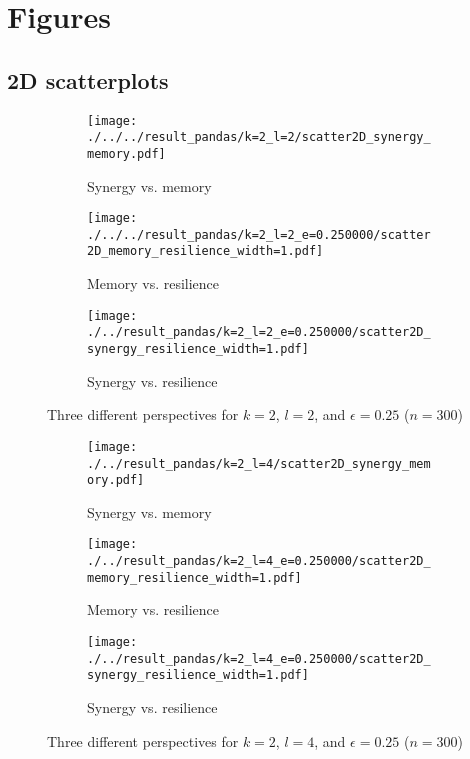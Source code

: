 \documentclass[../main.tex]{subfiles}
\begin{document}
\section{Figures}
\label{appendix_figures}

\subsection{2D scatterplots}

\begin{figure}[ht]
    \centering
    \begin{subfigure}[b]{0.3\textwidth}
        \texttt{[image: ./../../result\_pandas/k=2\_l=2/scatter2D\_synergy\_memory.pdf]}
        \caption{Synergy vs. memory}
    \end{subfigure}
    \begin{subfigure}[b]{0.3\textwidth}
        \texttt{[image: ./../../result\_pandas/k=2\_l=2\_e=0.250000/scatter2D\_memory\_resilience\_width=1.pdf]}
        \caption{Memory vs. resilience}
    \end{subfigure}
    \begin{subfigure}[b]{0.3\textwidth}
        \texttt{[image: ./../result\_pandas/k=2\_l=2\_e=0.250000/scatter2D\_synergy\_resilience\_width=1.pdf]}
        \caption{Synergy vs. resilience}
    \end{subfigure}
    \caption{Three different perspectives for $k=2$, $l=2$, and $\epsilon = 0.25$ ($n=300$)}
    \label{fig:2d22}
\end{figure}

\begin{figure}[ht]
    \centering
    \begin{subfigure}[b]{0.3\textwidth}
        \texttt{[image: ./../result\_pandas/k=2\_l=4/scatter2D\_synergy\_memory.pdf]}
        \caption{Synergy vs. memory}
    \end{subfigure}
    \begin{subfigure}[b]{0.3\textwidth}
        \texttt{[image: ./../result\_pandas/k=2\_l=4\_e=0.250000/scatter2D\_memory\_resilience\_width=1.pdf]}
        \caption{Memory vs. resilience}
    \end{subfigure}
    \begin{subfigure}[b]{0.3\textwidth}
        \texttt{[image: ./../result\_pandas/k=2\_l=4\_e=0.250000/scatter2D\_synergy\_resilience\_width=1.pdf]}
        \caption{Synergy vs. resilience}
    \end{subfigure}
    \caption{Three different perspectives for $k=2$, $l=4$, and $\epsilon = 0.25$ ($n=300$)}
    \label{fig:2d24}
\end{figure}
\end{document}
